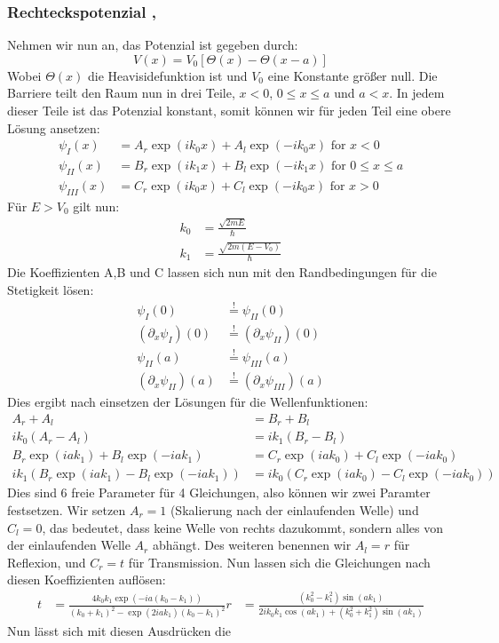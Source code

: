 \subsubsection{Rechteckspotenzial \cite{wolfgang2010experimentalphysik},
\cite{landau1991quantenmechanik} }
Nehmen wir nun an, das Potenzial ist gegeben durch:
\begin{equation}
    V(x) = V_0 \left [ \Theta(x) - \Theta(x-a) \right ] 
\end{equation}
Wobei $\Theta(x)$ die Heavisidefunktion ist und $V_0$ eine Konstante größer null.
Die Barriere teilt den Raum nun in drei Teile, $x<0$, $0\leqslant x\leqslant a$ und $a<x$.
In jedem dieser Teile ist das Potenzial konstant, somit können wir für jeden Teil eine
obere Lösung ansetzen:
\begin{align}
    \psi_I(x)    &= A_r \exp(ik_0x) + A_l  \exp(-ik_0x) \mbox{ for } x<0\\
    \psi_{II}(x) &= B_r \exp(ik_1x) + B_l  \exp(-ik_1x) \mbox{ for } 0 \leqslant x \leqslant a\\
    \psi_{III}(x)&= C_r \exp(ik_0x) + C_l  \exp(-ik_0x) \mbox{ for } x>0
\end{align}
Für $E>V_0$ gilt nun:
\begin{align}
    k_0 &= \frac{\sqrt{2mE}}{\hbar}\\
    k_1 &= \frac{\sqrt{2m(E-V_0)}}{\hbar}
\end{align}
Die Koeffizienten A,B und C lassen sich nun mit den Randbedingungen
für die Stetigkeit lösen:
\begin{align}
    \psi_I(0)&\overset{!}{=} \psi_{II}(0)\\
    (\partial_x\psi_I)(0)&\overset{!}{=} (\partial_x\psi_{II})(0)\\
    \psi_{II}(a)&\overset{!}{=} \psi_{III}(a)\\
    (\partial_x\psi_{II})(a)&\overset{!}{=} (\partial_x\psi_{III})(a)
\end{align}
Dies ergibt nach einsetzen der Lösungen für die Wellenfunktionen:
\begin{align}
  A_r + A_l &= B_r + B_l \\
  ik_0(A_r-A_l) &= ik_1(B_r-B_l)\\
  B_r\exp(iak_1)+B_l\exp(-iak_1)&=C_r \exp(iak_0)+C_l\exp(-iak_0)\\
  ik_1(B_r\exp(iak_1) - B_l\exp(-iak_1))&=ik_0(C_r\exp(iak_0)-C_l\exp(-iak_0))
\end{align}
Dies sind 6 freie Parameter für 4 Gleichungen, also können wir zwei 
Paramter festsetzen. Wir setzen $A_r =1$ (Skalierung nach der einlaufenden
Welle) und $C_l = 0$, das bedeutet, dass keine Welle von rechts dazukommt,
sondern alles von der einlaufenden Welle $A_r$ abhängt. Des weiteren
benennen wir $A_l=r$ für Reflexion, und $C_r=t$ für Transmission. Nun
lassen sich die Gleichungen nach diesen Koeffizienten auflösen:
\begin{align}
    t &= \frac{4k_0k_1\exp(-ia(k_0-k_1))}{(k_0+k_1)^2 - \exp(2iak_1)(k_0-k_1)^2}
    r &= \frac{(k_0^2 - k_1^2)\sin(ak_1)}{2ik_0k_1\cos(ak_1)+(k_0^2+k_1^2)\sin(ak_1)}
\end{align}
Nun lässt sich mit diesen Ausdrücken die 



